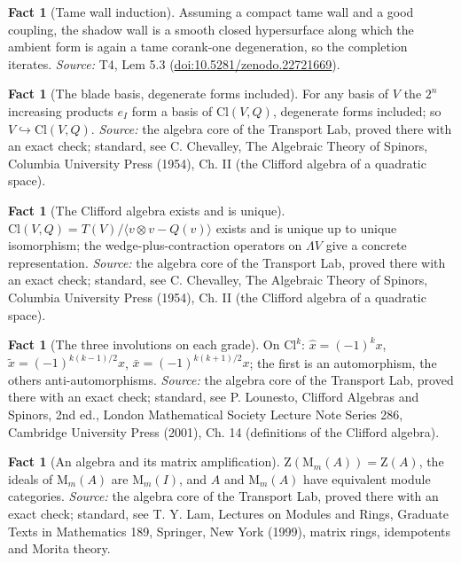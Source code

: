 \documentclass[11pt]{article}
\theoremstyle{definition}
\newtheorem{fact}[theorem]{Fact}
\theoremstyle{plain}
\providecommand{\Cl}{}\renewcommand{\Cl}{\mathrm{Cl}}
\providecommand{\Mat}{}\renewcommand{\Mat}{\mathrm{M}}
\providecommand{\Zc}{}\renewcommand{\Zc}{\mathrm{Z}}
\begin{document}
\begin{fact}[Tame wall induction]\label{c:sheaf.tame-wall-induction}
Assuming a compact tame wall and a good coupling, the shadow wall is a smooth closed hypersurface along which the ambient form is again a tame corank-one degeneration, so the completion iterates.
\emph{Source:} T4, Lem 5.3 (\href{https://doi.org/10.5281/zenodo.22721669}{doi:10.5281/zenodo.22721669}).
\end{fact}

\begin{fact}[The blade basis, degenerate forms included]\label{c:std-algebra.blade-basis}
For any basis of $V$ the $2^{n}$ increasing products $e_I$ form a basis of $\Cl(V, Q)$, degenerate forms included; so $V \hookrightarrow \Cl(V, Q)$.
\emph{Source:} the algebra core of the Transport Lab, proved there with an exact check; standard, see C. Chevalley, The Algebraic Theory of Spinors, Columbia University Press (1954), Ch. II (the Clifford algebra of a quadratic space).
\end{fact}

\begin{fact}[The Clifford algebra exists and is unique]\label{c:std-algebra.existence-uniqueness}
$\Cl(V, Q) = T(V)/\langle v \otimes v - Q(v) \rangle$ exists and is unique up to unique isomorphism; the wedge-plus-contraction operators on $\Lambda V$ give a concrete representation.
\emph{Source:} the algebra core of the Transport Lab, proved there with an exact check; standard, see C. Chevalley, The Algebraic Theory of Spinors, Columbia University Press (1954), Ch. II (the Clifford algebra of a quadratic space).
\end{fact}

\begin{fact}[The three involutions on each grade]\label{c:std-algebra.involution-properties}
On $\Cl^{k}$: $\hat{x} = (-1)^{k}x$, $\tilde{x} = (-1)^{k(k-1)/2}x$, $\bar{x} = (-1)^{k(k+1)/2}x$; the first is an automorphism, the others anti-automorphisms.
\emph{Source:} the algebra core of the Transport Lab, proved there with an exact check; standard, see P. Lounesto, Clifford Algebras and Spinors, 2nd ed., London Mathematical Society Lecture Note Series 286, Cambridge University Press (2001), Ch. 14 (definitions of the Clifford algebra).
\end{fact}

\begin{fact}[An algebra and its matrix amplification]\label{c:std-algebra.morita-amplification}
$\Zc(\Mat_m(A)) = \Zc(A)$, the ideals of $\Mat_m(A)$ are $\Mat_m(I)$, and $A$ and $\Mat_m(A)$ have equivalent module categories.
\emph{Source:} the algebra core of the Transport Lab, proved there with an exact check; standard, see T. Y. Lam, Lectures on Modules and Rings, Graduate Texts in Mathematics 189, Springer, New York (1999), matrix rings, idempotents and Morita theory.
\end{fact}
\end{document}
